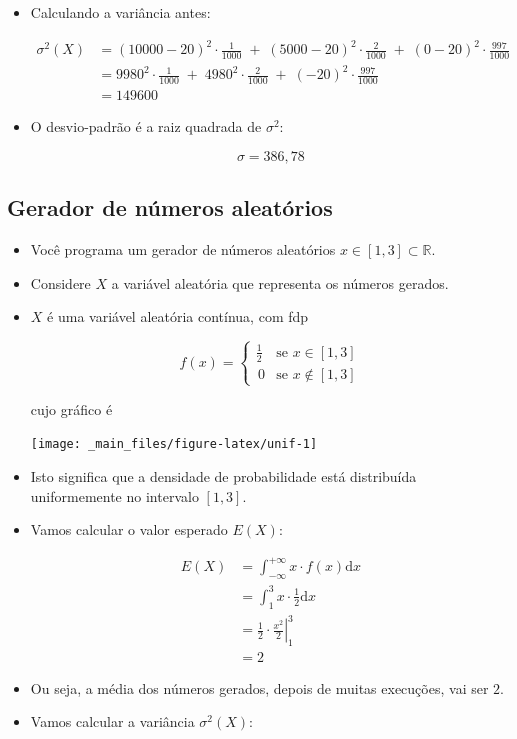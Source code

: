 \documentclass[
  11pt]{report}
\begin{document}
\begin{itemize}
  \begin{itemize}
  \item
    Calculando a variância antes:

    \[
     \begin{aligned}
     \sigma^2(X) &= (10000 - 20)^2 \cdot \frac{1}{1000} \;+\; (5000 -20)^2 \cdot \frac{2}{1000} \;+\; (0 - 20)^2 \cdot \frac{997}{1000} \\
          &= 9980^2 \cdot \frac{1}{1000} \;+\; 4980^2 \cdot \frac{2}{1000} \;+\; (- 20)^2 \cdot \frac{997}{1000} \\
          &= 149600
     \end{aligned}
    \]
  \item
    O desvio-padrão é a raiz quadrada de $\sigma^2$:

    \[
    \sigma = 386{,}78
    \]
  \end{itemize}
\end{itemize}

\hypertarget{gerador-de-nuxfameros-aleatuxf3rios}{%
\subsection{Gerador de números aleatórios}\label{gerador-de-nuxfameros-aleatuxf3rios}}

\begin{itemize}
\item
  Você programa um gerador de números aleatórios $x \in [1, 3] \subset \mathbb{R}$.
\item
  Considere $X$ a variável aleatória que representa os números gerados.
\item
  $X$ é uma variável aleatória contínua, com fdp

  \[
  f(x) = 
    \begin{cases}\displaystyle
      \frac{1}{2} & \text{se } x \in [1, 3] \\
      \,0 & \text{se } x \not\in [1, 3]
    \end{cases}
  \]

  cujo gráfico é

  \begin{center}\texttt{[image: \_main\_files/figure-latex/unif-1]} \end{center}
\item
  Isto significa que a densidade de probabilidade está distribuída uniformemente no intervalo $[1, 3]$.
\item
  Vamos calcular o valor esperado $E(X)$:

  \[
  \begin{aligned}
  E(X) 
    &= \int_{-\infty}^{+ \infty} x \cdot f(x) \text{d}x \\
    &= \int_{1}^{3} x \cdot \frac{1}{2} \text{d}x \\
    &= \frac12 \cdot \left.\frac{x^2}{2} \right|_1^3 \\
    &= 2
  \end{aligned}
  \]
\item
  Ou seja, a média dos números gerados, depois de muitas execuções, vai ser $2$.
\item
  Vamos calcular a variância $\sigma^2(X)$:
\end{itemize}
\end{document}
